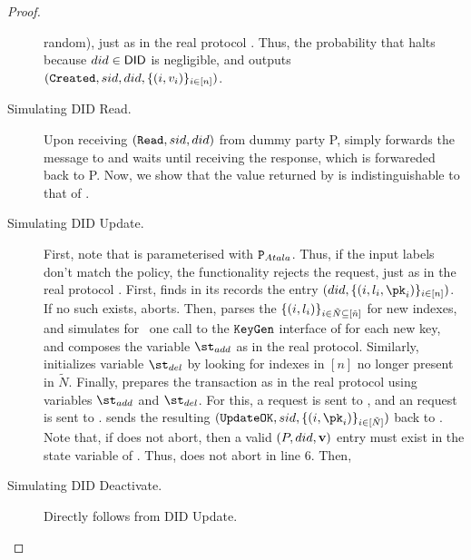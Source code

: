 \begin{proof}
\begin{description}
    random), just as in the real protocol \RealPKIDIDAtala. Thus, the
    probability that \IdealFPKIDID halts because $\did \in \DID$ is negligible,
    and \IdealFPKIDID outputs $(\uccmd{Created},\sid,\did,\lbrace (i,\val_i)
    \rbrace_{i\in[n]})$.
  \item[Simulating DID Read.]
    Upon receiving $(\uccmd{Read},\sid,\did)$ from dummy party P, \Sim simply
    forwards the message to \adv and waits until receiving the response, which
    is forwareded back to P.
    Now, we show that the value returned by \IdealFPKIDID is indistinguishable
    to that of \RealPKIDIDAtala. 
  \item[Simulating DID Update.]
    First, note that \IdealFPKIDID is parameterised with $\P_{Atala}$. Thus,
    if the input labels don't match the policy, the functionality rejects the
    request, just as in the real protocol \RealPKIDIDAtala.
    First, \Sim finds in its records the entry $(\did,\lbrace (i,\lbl_i,\pk_i)
    \rbrace_{i\in[n]})$. If no such \did exists, aborts.
    Then, \Sim parses the $\lbrace(i,\lbl_i)\rbrace_{i\in\tilde{N}\subseteq
      [\tilde{n}]}$ for new indexes, and simulates for \adv~one call to the
    $\uccmd{KeyGen}$ interface of \IdealFSig for each new key, and composes the
    variable $\st_{add}$ as in the real protocol. Similarly, \Sim initializes
    variable $\st_{del}$ by looking for indexes in $[n]$ no longer present in
    $\tilde{N}$.
    Finally, \Sim prepares the transaction \tx as in the real protocol using
    variables $\st_{add}$ and $\st_{del}$. For this, a  request is
    sent to \IdealFSign, and an  request is sent to \IdealFaobb.
    \Sim sends the resulting $(\uccmd{UpdateOK},\sid,\lbrace (i,\pk_i)
    \rbrace_{i\in[\tilde{N}]})$ back to \IdealFPKIDID.
    Note that, if \Sim does not abort, then a valid $(P,\did,\sval)$ entry must
    exist in the \DID state variable of \IdealFPKIDID. Thus, \IdealFPKIDID does
    not abort in line 6. Then, \IdealFPKIDID
  \item[Simulating DID Deactivate.] Directly follows from DID Update.      
  \end{description}
\end{proof}


